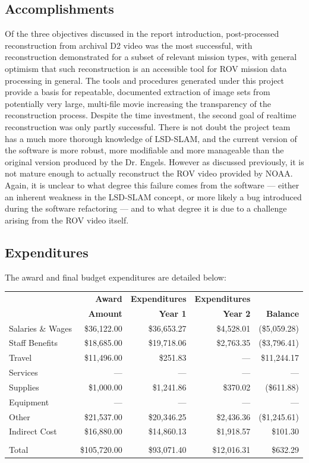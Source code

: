 \documentclass[letterpaper,12pt]{article}
\begin{document}
\subsection{Accomplishments}

Of the three objectives discussed in the report introduction, post-processed reconstruction from archival D2 video was the most successful, with reconstruction demonstrated for a subset of relevant mission types, with general optimism that such reconstruction is an accessible tool for ROV mission data processing in general.   The tools and procedures generated under this project provide a basis for repeatable, documented extraction of image sets from potentially very large, multi-file movie increasing the transparency of the reconstruction process.   Despite the time investment, the second goal of realtime reconstruction was only partly successful.   There is not doubt the project team has a much more thorough knowledge of LSD-SLAM, and the current version of the software is more robust, more modifiable and more manageable than the original version produced by the Dr. Engels.  However as discussed previously, it is not mature enough to actually reconstruct the ROV video provided by NOAA.  Again, it is unclear to what degree this failure comes from the software --- either an inherent weakness in the LSD-SLAM concept, or more likely a bug introduced during the software refactoring --- and to what degree it is due to a challenge arising from the ROV video itself.

\subsection{Expenditures}

The award and final budget expenditures are detailed below:

\begin{tabularx}{0.9\textwidth}{X|rrrr}
    & \textbf{Award} & \textbf{Expenditures} & \textbf{Expenditures} &  \\
    & \textbf{Amount} & \textbf{Year 1} & \textbf{Year 2} & \textbf{Balance} \\
    \hline\hline
    Salaries \& Wages & \$36,122.00 & \$36,653.27 & \$4,528.01 & (\$5,059.28) \\
    Staff Benefits & \$18,685.00 & \$19,718.06 & \$2,763.35 & (\$3,796.41) \\
    Travel & \$11,496.00 & \$251.83 & --- & \$11,244.17 \\
    Services & --- & --- & --- & --- \\
    Supplies & \$1,000.00 & \$1,241.86 & \$370.02 & (\$611.88) \\
    Equipment & --- & --- & --- & --- \\
    Other & \$21,537.00 & \$20,346.25 & \$2,436.36 & (\$1,245.61) \\
    Indirect Cost & \$16,880.00 & \$14,860.13 & \$1,918.57 & \$101.30 \\
     \\
    Total & \$105,720.00 & \$93,071.40 & \$12,016.31 & \$632.29 
\end{tabularx}
\end{document}
